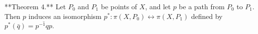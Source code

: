 **Theorem 4.** Let $P_0$ and $P_1$ be points of $X$, and let $p$ be a path from $P_0$ to $P_1$. Then $p$ induces an isomorphism $p^*: \pi(X, P_0) \leftrightarrow \pi(X, P_1)$ defined by $p^*(\bar{q}) = \overline{p^{-1}qp}$.

